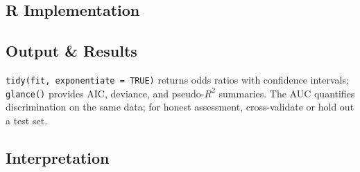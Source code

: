 \documentclass[
]{article}
\newenvironment{Shaded}{\begin{snugshade}}{\end{snugshade}}
\newcommand{\AttributeTok}[1]{\textcolor[rgb]{0.13,0.29,0.53}{#1}}
\newcommand{\CommentTok}[1]{\textcolor[rgb]{0.56,0.35,0.01}{\textit{#1}}}
\newcommand{\ConstantTok}[1]{\textcolor[rgb]{0.56,0.35,0.01}{#1}}
\newcommand{\FunctionTok}[1]{\textcolor[rgb]{0.13,0.29,0.53}{\textbf{#1}}}
\newcommand{\NormalTok}[1]{#1}
\newcommand{\OtherTok}[1]{\textcolor[rgb]{0.56,0.35,0.01}{#1}}
\newcommand{\SpecialCharTok}[1]{\textcolor[rgb]{0.81,0.36,0.00}{\textbf{#1}}}
\newcommand{\StringTok}[1]{\textcolor[rgb]{0.31,0.60,0.02}{#1}}
\begin{document}
\subsection{R Implementation}\label{r-implementation}

\begin{Shaded}
\end{Shaded}

\subsection{Output \& Results}\label{output-results}

\texttt{tidy(fit,\ exponentiate\ =\ TRUE)} returns odds ratios with
confidence intervals; \texttt{glance()} provides AIC, deviance, and
pseudo-\(R^2\) summaries. The AUC quantifies discrimination on the same
data; for honest assessment, cross-validate or hold out a test set.

\subsection{Interpretation}\label{interpretation}
\end{document}
